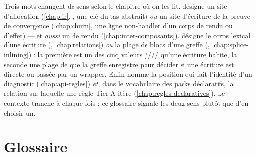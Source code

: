 \begin{piege}
Trois mots changent de sens selon le chapitre où on les lit. 
désigne un site d'allocation (\cref{chap:ir}, , une clé du tas
abstrait) \emph{ou} un site d'écriture de la preuve de convergence
(\cref{chap:churn}, une ligne non-handler d'un corps de rendu ou d'effet) ---
et \emph{aussi} un  de rendu (\cref{chap:inter-composants}).
 désigne le corps lexical d'une écriture (,
\cref{chap:relations}) \emph{ou} la plage de blocs d'une greffe
(, \cref{chap:splice-inlining}) : la première est un des
cinq valeurs ////
qu'une écriture habite, la seconde une plage  de
 que la greffe enregistre pour décider si une écriture est
directe ou passée par un wrapper. Enfin
 nomme la position qui fait l'identité d'un diagnostic
(\cref{chap:api-regles}) \emph{et}, dans le vocabulaire des packs
déclaratifs, la relation sur laquelle une règle Tier-A itère
(\cref{chap:regles-declaratives}). Le contexte tranche à chaque fois ; ce
glossaire signale les deux sens plutôt que d'en choisir un.
\end{piege}

\section*{Glossaire}


